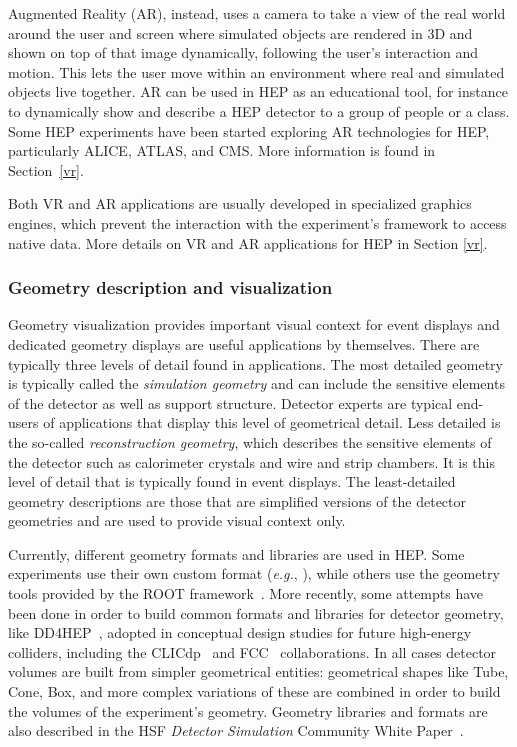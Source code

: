\documentclass[12pt,a4paper]{article}
\begin{document}
Augmented Reality (AR), instead, uses a camera to take a view of the real world around the user and screen where simulated
objects are rendered in 3D and shown on top of that image dynamically, following the user's interaction and motion.
This lets the user move within an environment where real and simulated objects live together. AR can be used in HEP as
an educational tool, for instance to dynamically show and describe a HEP detector to a group of people or a class.
Some HEP experiments have been started exploring AR technologies for HEP, particularly ALICE, ATLAS, and CMS. More information
is found in Section~\ref{vr}.

Both VR and AR applications are usually developed in specialized graphics engines, which prevent the interaction
with the experiment's framework to access native data. More details on VR and AR applications for HEP in Section \ref{vr}.


\hypertarget{geometry-description}{%
\subsubsection{Geometry description and visualization}\label{geometry-description}}

Geometry visualization provides important visual context for event displays and dedicated geometry displays are useful
applications by themselves. There are typically three levels of detail found in applications. The most detailed geometry
is typically called the \textit{simulation geometry} and can include the sensitive elements of the detector as well
as support structure. Detector experts are typical end-users of applications that display this level of geometrical detail. Less
detailed is the so-called \textit{reconstruction geometry}, which describes the sensitive elements of the detector
such as calorimeter crystals and wire and strip chambers. It is this level of detail that is typically found in
event displays. The least-detailed geometry descriptions are those that are simplified versions of the
detector geometries and are used to provide visual context only.

Currently, different geometry formats and libraries are used in HEP. 
Some experiments use their own custom format (\textit{e.g.}, \cite{ATLASGeoModel2004}), while others use the geometry tools provided by the ROOT framework~\cite{Root1997}.
More recently, some attempts have been done in order to build common formats and libraries for detector geometry, like DD4HEP~\cite{dd4hep},
adopted in conceptual design studies for future high-energy colliders, including the CLICdp~\cite{clicdp} and FCC~\cite{fcc} collaborations.
In all cases detector volumes are built from simpler geometrical entities: geometrical shapes like Tube, Cone, Box, and
more complex variations of these are combined in order to build the volumes of the experiment’s geometry.
Geometry libraries and formats are also described in the HSF \textit{Detector Simulation} Community White Paper~\cite{HSF-CWP-2017-07}.
\end{document}
